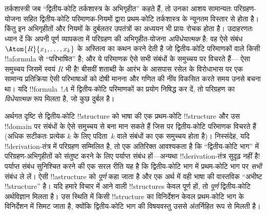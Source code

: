 \documentclass[../../../include/open-logic-section]{subfiles}
\begin{document}
तर्कशास्त्री जब ``द्वितीय-कोटि तर्कशास्त्र के अभिगृहीत'' कहते हैं, तो उनका
आशय सामान्यतः परिग्रहण-योजना सहित द्वितीय-कोटि परिमाणक-नियमों द्वारा
प्रथम-कोटि तर्कशास्त्र के न्यूनतम विस्तार से होता है। किंतु इन अभिगृहीतों
और नियमों के दुर्बलतर उपतंत्रों का अध्ययन भी प्रायः रोचक होता है। उदाहरणतः
ध्यान दें कि अपनी पूर्ण व्यापकता में परिग्रहण की अभिगृहीत-योजना
\emph{अविधेयात्मक} है: वह ऐसे संबंध $\Atom{R}{x_1, \dots, x_k}$ के अस्तित्व
का कथन करने देती है जो द्वितीय-कोटि परिमाणकों वाले किसी !!a{formula} से
``परिभाषित'' है; और ये परिमाणक ऐसे सभी संबंधों के समुच्चय पर विचरते हैं---
ऐसा समुच्चय जिसमें स्वयं $R$ भी है!{} बीसवीं शताब्दी के आरंभ के आसपास रसेल
के विरोधाभास पर एक सामान्य प्रतिक्रिया ऐसी परिभाषाओं को दोषी मानना और
गणित की नींव विकसित करते समय उनसे बचना था। यदि !!{formula}~$!A$ में
द्वितीय-कोटि परिमाणकों का प्रयोग निषिद्ध कर दें, तो परिग्रहण का
{\em विधेयात्मक} रूप मिलता है, जो कुछ दुर्बल है।

अर्थगत दृष्टि से द्वितीय-कोटि !!{structure} को भाषा की एक प्रथम-कोटि
!!{structure} और उस !!{domain} पर संबंधों के ऐसे समुच्चय से बना मान सकते हैं
जिस पर द्वितीय-कोटि परिमाणक विचरते हैं (अधिक सटीकतः प्रत्येक $k$ के लिए
पदिता~$k$ वाले संबंधों का एक समुच्चय होता है)। निस्संदेह, यदि
!!{derivation}-तंत्र में परिग्रहण सम्मिलित है, तो एक अतिरिक्त आवश्यकता है
कि ``द्वितीय-कोटि भाग'' में परिग्रहण-अभिगृहीतों को संतुष्ट करने के लिए पर्याप्त
संबंध हों---अन्यथा !!{derivation}-तंत्र सुदृढ़ नहीं है!{} पर्याप्त संबंध
सुनिश्चित करने की एक सरल रीति यह है कि द्वितीय-कोटि भाग में प्रथम-कोटि भाग
पर \emph{सभी} संबंध ले लें। ऐसी !!a{structure} को \emph{पूर्ण} कहा जाता है
और एक अर्थ में वही भाषा की वास्तविक ``अभीष्ट !!{structure}'' है। यदि हमारे
विचार में आने वाली !!{structure}s केवल पूर्ण हों, तो \emph{पूर्ण} द्वितीय-कोटि
अर्थविज्ञान मिलता है। उस स्थिति में किसी !!{structure} का विनिर्देशन केवल
प्रथम-कोटि भाग के विनिर्देशन में सिमट जाता है, क्योंकि द्वितीय-कोटि भाग की
विषयवस्तु उससे अंतर्निहित रूप से मिलती है।
\end{document}
